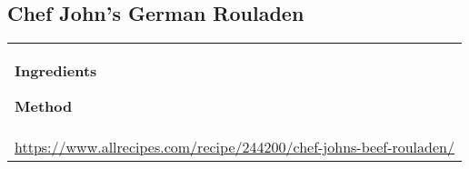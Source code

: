 \documentclass[../web-recipes.tex]{subfiles}
\begin{document}
\pagestyle{empty}

    \renewcommand{\mytitle}{Chef John's German Rouladen}
    \renewcommand{\myurl}{https://www.allrecipes.com/recipe/244200/chef-johns-beef-rouladen/}
    \begin{mdframed}[nobreak]
      \section{\mytitle}
      \begin{tabular}{l}
        \begin{minipage}[t]{0.35\textwidth}
          {\sffamily\bfseries Ingredients}\vspace{0.5ex}
          
        \end{minipage}
        \qquad
        \begin{minipage}[t]{0.55\textwidth}
          {\sffamily\bfseries Method}\vspace{0.5ex}
          
        \end{minipage} \vspace{3ex}\\
        \multicolumn{1}{c}{\small\ttfamily \url{\myurl}} \\
      \end{tabular}
    \end{mdframed}
    
\end{document}
